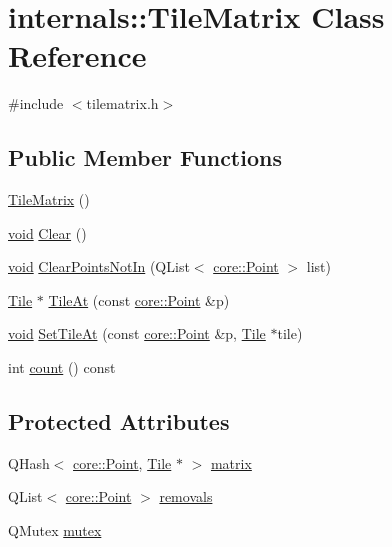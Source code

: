 \hypertarget{classinternals_1_1_tile_matrix}{\section{internals\-:\-:\-Tile\-Matrix \-Class \-Reference}
\label{classinternals_1_1_tile_matrix}
}


{\ttfamily \#include $<$tilematrix.\-h$>$}

\subsection*{\-Public \-Member \-Functions}
\begin{DoxyCompactItemize}
\item 
\hyperlink{group___o_p_map_widget_ga3d1378e5fe1bbfe4113a4ce68aea7859}{\-Tile\-Matrix} ()
\item 
\hyperlink{group___u_a_v_objects_plugin_ga444cf2ff3f0ecbe028adce838d373f5c}{void} \hyperlink{group___o_p_map_widget_ga77cb176c33480b11c18a63824649e839}{\-Clear} ()
\item 
\hyperlink{group___u_a_v_objects_plugin_ga444cf2ff3f0ecbe028adce838d373f5c}{void} \hyperlink{group___o_p_map_widget_ga6317ab91209c66759964ba340bd3b980}{\-Clear\-Points\-Not\-In} (\-Q\-List$<$ \hyperlink{structcore_1_1_point}{core\-::\-Point} $>$ list)
\item 
\hyperlink{classinternals_1_1_tile}{\-Tile} $\ast$ \hyperlink{group___o_p_map_widget_gacf6a186610bc126a6fdd89149f0452e6}{\-Tile\-At} (const \hyperlink{structcore_1_1_point}{core\-::\-Point} \&p)
\item 
\hyperlink{group___u_a_v_objects_plugin_ga444cf2ff3f0ecbe028adce838d373f5c}{void} \hyperlink{group___o_p_map_widget_gad2d5e21b31c1b3a0420990925a7e6cdc}{\-Set\-Tile\-At} (const \hyperlink{structcore_1_1_point}{core\-::\-Point} \&p, \hyperlink{classinternals_1_1_tile}{\-Tile} $\ast$tile)
\item 
int \hyperlink{group___o_p_map_widget_gad7ee58d6ccda306fff324d62676aab7a}{count} () const 
\end{DoxyCompactItemize}
\subsection*{\-Protected \-Attributes}
\begin{DoxyCompactItemize}
\item 
\-Q\-Hash$<$ \hyperlink{structcore_1_1_point}{core\-::\-Point}, \hyperlink{classinternals_1_1_tile}{\-Tile} $\ast$ $>$ \hyperlink{group___o_p_map_widget_gaecc6fdfe28242560867ab83c02820b20}{matrix}
\item 
\-Q\-List$<$ \hyperlink{structcore_1_1_point}{core\-::\-Point} $>$ \hyperlink{group___o_p_map_widget_gaba9b5e3cf2e51b2a87c5a343968573e9}{removals}
\item 
\-Q\-Mutex \hyperlink{group___o_p_map_widget_gae5c51dfc2c2d290c958e335bef18f0a1}{mutex}
\end{DoxyCompactItemize}


